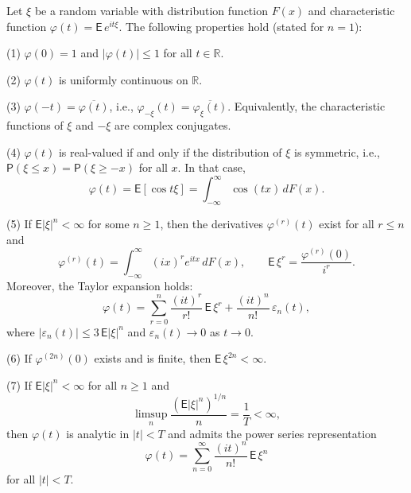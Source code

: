 Let $\xi$ be a random variable with distribution function $F(x)$ and characteristic function $\varphi(t) = \mathsf{E}\, e^{it\xi}$. The following properties hold (stated for $n = 1$):

(1) $\varphi(0) = 1$ and $|\varphi(t)| \leq 1$ for all $t \in \mathbb{R}$.

(2) $\varphi(t)$ is uniformly continuous on $\mathbb{R}$.

(3) $\varphi(-t) = \overline{\varphi(t)}$, i.e., $\varphi_{-\xi}(t) = \overline{\varphi_\xi(t)}$. Equivalently, the characteristic functions of $\xi$ and $-\xi$ are complex conjugates.

(4) $\varphi(t)$ is real-valued if and only if the distribution of $\xi$ is symmetric, i.e., $\mathsf{P}(\xi \leq x) = \mathsf{P}(\xi \geq -x)$ for all $x$. In that case,
$$\varphi(t) = \mathsf{E}[\cos t\xi] = \int_{-\infty}^{\infty} \cos(tx) \, dF(x).$$

(5) If $\mathsf{E}|\xi|^n < \infty$ for some $n \geq 1$, then the derivatives $\varphi^{(r)}(t)$ exist for all $r \leq n$ and
$$\varphi^{(r)}(t) = \int_{-\infty}^{\infty} (ix)^r e^{itx} \, dF(x), \qquad \mathsf{E}\,\xi^r = \frac{\varphi^{(r)}(0)}{i^r}.$$
Moreover, the Taylor expansion holds:
$$\varphi(t) = \sum_{r=0}^{n} \frac{(it)^r}{r!}\,\mathsf{E}\,\xi^r + \frac{(it)^n}{n!}\,\varepsilon_n(t),$$
where $|\varepsilon_n(t)| \leq 3\,\mathsf{E}|\xi|^n$ and $\varepsilon_n(t) \to 0$ as $t \to 0$.

(6) If $\varphi^{(2n)}(0)$ exists and is finite, then $\mathsf{E}\,\xi^{2n} < \infty$.

(7) If $\mathsf{E}|\xi|^n < \infty$ for all $n \geq 1$ and
$$\limsup_{n} \frac{(\mathsf{E}|\xi|^n)^{1/n}}{n} = \frac{1}{T} < \infty,$$
then $\varphi(t)$ is analytic in $|t| < T$ and admits the power series representation
$$\varphi(t) = \sum_{n=0}^{\infty} \frac{(it)^n}{n!}\,\mathsf{E}\,\xi^n$$
for all $|t| < T$.
